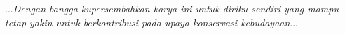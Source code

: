 \begin{center}
...\emph{Dengan bangga kupersembahkan karya ini untuk diriku sendiri yang mampu tetap yakin untuk berkontribusi pada upaya konservasi kebudayaan}...
\end{center}

